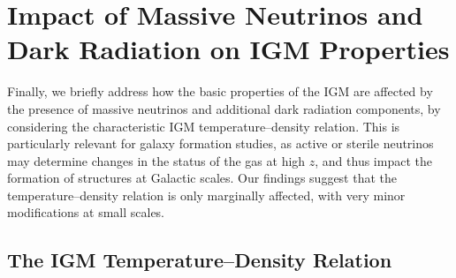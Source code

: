 \documentclass{emulateapj}
\begin{document}


\section{Impact of Massive Neutrinos and Dark Radiation on IGM Properties} \label{section_nl_igm}

Finally, we briefly address how the basic properties of the IGM are
affected by the presence of massive neutrinos
and additional dark radiation components, by considering 
the characteristic IGM temperature--density relation.  
This is particularly relevant for galaxy formation studies,
as active or sterile neutrinos may determine changes in the status of the gas at high $z$,
and thus impact 
the formation of structures at Galactic scales. 
Our findings suggest that the
temperature--density relation is only marginally affected, with very
minor modifications at small scales. 


\subsection{The IGM Temperature--Density Relation}
\end{document}
